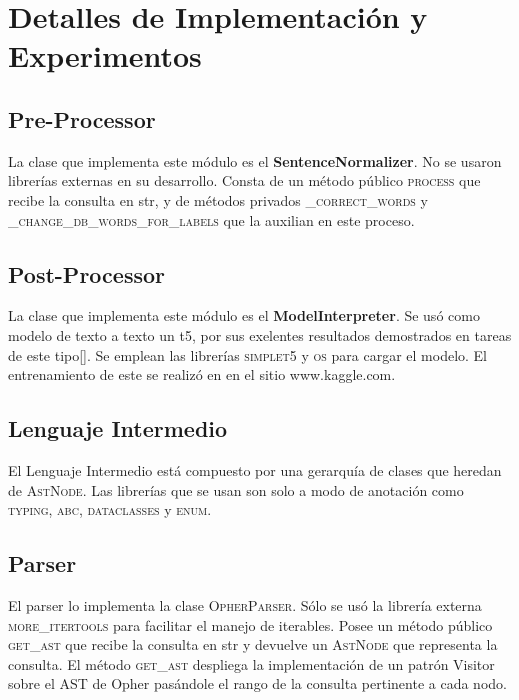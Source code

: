 \chapter{Detalles de Implementación y Experimentos}\label{chapter:implementation}


\section{Pre-Processor}

La clase que implementa este m\'odulo es el \textbf{SentenceNormalizer}. No se usaron librer\'ias externas en su desarrollo. Consta de un m\'etodo p\'ublico \textsc{process} que recibe la consulta en str, y de m\'etodos privados \textsc{_correct_words} y \textsc{_change_db_words_for_labels} que la auxilian en este proceso.


\section{Post-Processor}

La clase que implementa este m\'odulo es el \textbf{ModelInterpreter}. Se us\'o como modelo de texto a texto un t5, por sus exelentes resultados demostrados en tareas de este tipo[]. Se emplean las librer\'ias \textsc{simplet5} y \textsc{os} para cargar el modelo. El entrenamiento de este se realiz\'o en en el sitio www.kaggle.com. 


\section{Lenguaje Intermedio}

El Lenguaje Intermedio est\'a compuesto por una gerarqu\'ia de clases que heredan de \textsc{AstNode}. Las librer\'ias que se usan son solo a modo de anotaci\'on como \textsc{typing}, \textsc{abc}, \textsc{dataclasses} y \textsc{enum}.\\


\section{Parser}

El parser lo implementa la clase \textsc{OpherParser}. S\'olo se us\'o la librer\'ia externa \textsc{more_itertools} para facilitar el manejo de iterables. Posee un m\'etodo p\'ublico \textsc{get_ast} que recibe la consulta en str y devuelve un \textsc{AstNode} que representa la consulta. El m\'etodo \textsc{get_ast} despliega la implementaci\'on de un patr\'on Visitor sobre el AST de Opher pas\'andole el rango de la consulta pertinente a cada nodo.\\ 

